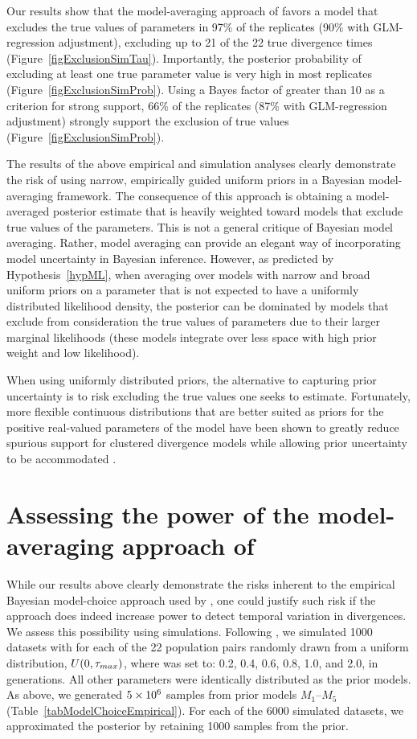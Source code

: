 Our results show that the model-averaging approach of \citet{Hickerson2013}
favors a model that excludes the true values of parameters in 97\% of the
replicates (90\% with GLM-regression adjustment), excluding up to 21 of the 22
true divergence times (Figure~\ref{figExclusionSimTau}).
Importantly, the posterior probability of excluding at least one true parameter
value is very high in most replicates
(Figure~\ref{figExclusionSimProb}).
Using a Bayes factor of greater than 10 as a criterion for strong support, 66\%
of the replicates (87\% with GLM-regression adjustment) strongly support the
exclusion of true values (Figure~\ref{figExclusionSimProb}).

The results of the above empirical and simulation analyses clearly demonstrate
the risk of using narrow, empirically guided uniform priors in a Bayesian
model-averaging framework.
The consequence of this approach is obtaining a model-averaged posterior
estimate that is heavily weighted toward models that exclude true
values of the parameters.
This is not a general critique of Bayesian model averaging.
Rather, model averaging can provide an elegant way of incorporating
model uncertainty in Bayesian inference.
However, as predicted by Hypothesis~\ref{hypML}, when averaging over models
with narrow and broad uniform priors on a parameter that is not expected to
have a uniformly distributed likelihood density, the posterior can be dominated
by models that exclude from consideration the true values of parameters due to
their larger marginal likelihoods (these models integrate over less space with
high prior weight and low likelihood).

When using uniformly distributed priors, the alternative to capturing prior
uncertainty is to risk excluding the true values one seeks to estimate.
Fortunately, more flexible continuous distributions that are better suited as
priors for the positive real-valued parameters of the \msb model have been
shown to greatly reduce spurious support for clustered divergence models while
allowing prior uncertainty to be accommodated
\citep{Oaks2014dpp}.


\section{Assessing the power of the model-averaging approach of
    \citet{Hickerson2013}}
While our results above clearly demonstrate the risks inherent to the empirical
Bayesian model-choice approach used by \citet{Hickerson2013}, one could justify
such risk if the approach does indeed increase power to detect temporal
variation in divergences.
We assess this possibility using simulations.
Following \citet{Oaks2012}, we simulated 1000 datasets with \divt{} for each of
the 22 population pairs randomly drawn from a uniform distribution, $U(0,
\tau_{max})$, where  was set to: 0.2, 0.4, 0.6, 0.8, 1.0, and 2.0, in
\globalcoalunit generations.
All other parameters were identically distributed as the prior models.
As above, we generated $5\times 10^{6}$ samples from prior models $M_1$--$M_5$
(Table~\ref{tabModelChoiceEmpirical}).
For each of the 6000 simulated datasets, we approximated the posterior
by retaining 1000 samples from the prior.

